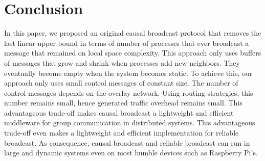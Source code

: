 
\section{Conclusion}
\label{sec:conclusion}


In this paper, we proposed an original causal broadcast protocol that removes
the last linear upper bound in terms of number of processes that ever broadcast
a message that remained on local space complexity. This approach only uses
buffers of messages that grow and shrink when processes add new neighbors. They
eventually become empty when the system becomes static. To achieve this, our
approach only uses small control messages of constant size. The number of
control messages depends on the overlay network. Using routing strategies, this
number remains small, hence generated traffic overhead remains small. This
advantageous trade-off makes causal broadcast a lightweight and efficient
middleware for group communication in distributed systems. This advantageous
trade-off even makes \RPCBROADCAST a lightweight and efficient implementation
for reliable broadcast. As consequence, causal broadcast and reliable broadcast
can run in large and dynamic systems even on most humble devices such as
Raspberry Pi’s.




